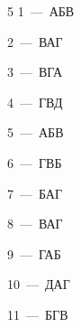 \documentclass[12pt]{article}
\begin{document}
\begin{multicols}{5}\noindent
\mbox{1~--- АБВ}\par
\mbox{2~--- ВАГ}\par
\mbox{3~--- ВГА}\par
\mbox{4~--- ГВД}\par
\mbox{5~--- АБВ}\par
\mbox{6~--- ГВБ}\par
\mbox{7~--- БАГ}\par
\mbox{8~--- ВАГ}\par
\mbox{9~--- ГАБ}\par
\mbox{10~--- ДАГ}\par
\mbox{11~--- БГВ}
\end{multicols}

\par
\end{document}
